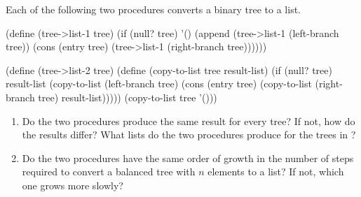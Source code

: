 \begin{exercise}
	\label{Exercise 2.63}
	Each of the following two procedures converts a binary tree to a list.
	\begin{scheme}
	  (define (tree->list-1 tree)
	    (if (null? tree)
	        '()
	        (append (tree->list-1 (left-branch tree))
	                (cons (entry tree)
	                      (tree->list-1 (right-branch tree))))))

	  (define (tree->list-2 tree)
	    (define (copy-to-list tree result-list)
	      (if (null? tree)
	          result-list
	          (copy-to-list (left-branch tree)
	                        (cons (entry tree)
	                              (copy-to-list (right-branch tree)
	                                            result-list)))))
	    (copy-to-list tree '()))
	\end{scheme}
	\begin{enumerate}[label = \alph*., leftmargin = *]

		\item
			Do the two procedures produce the same result for every tree?
			If not, how do the results differ?
			What lists do the two procedures produce for the trees in ?

		\item
			Do the two procedures have the same order of growth in the number of steps required to convert a balanced tree with \( n \) elements to a list?
			If not, which one grows more slowly?

	\end{enumerate}
\end{exercise}



